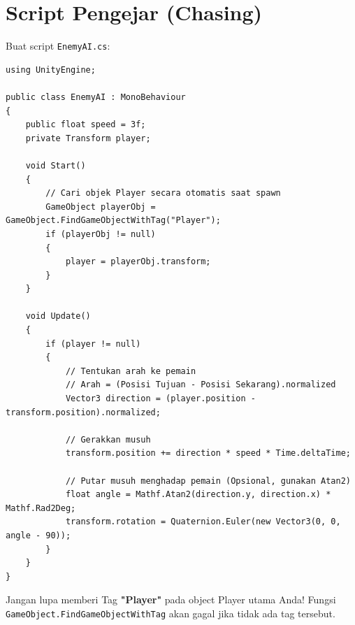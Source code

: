 
\section{Script Pengejar (Chasing)}

Buat script \texttt{EnemyAI.cs}:

\begin{lstlisting}[language={[Sharp]C}]
using UnityEngine;

public class EnemyAI : MonoBehaviour
{
    public float speed = 3f;
    private Transform player;

    void Start()
    {
        // Cari objek Player secara otomatis saat spawn
        GameObject playerObj = GameObject.FindGameObjectWithTag("Player");
        if (playerObj != null)
        {
            player = playerObj.transform;
        }
    }

    void Update()
    {
        if (player != null)
        {
            // Tentukan arah ke pemain
            // Arah = (Posisi Tujuan - Posisi Sekarang).normalized
            Vector3 direction = (player.position - transform.position).normalized;
            
            // Gerakkan musuh
            transform.position += direction * speed * Time.deltaTime;
            
            // Putar musuh menghadap pemain (Opsional, gunakan Atan2)
            float angle = Mathf.Atan2(direction.y, direction.x) * Mathf.Rad2Deg;
            transform.rotation = Quaternion.Euler(new Vector3(0, 0, angle - 90));
        }
    }
}
\end{lstlisting}

\begin{tips}
Jangan lupa memberi Tag \textbf{"Player"} pada object Player utama Anda! Fungsi \texttt{GameObject.\allowbreak FindGameObjectWithTag} akan gagal jika tidak ada tag tersebut.
\end{tips}
